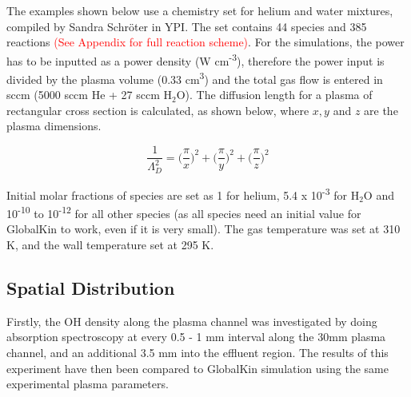 \documentclass[11pt, oneside]{article}   	%
\begin{document}
The examples shown below use a chemistry set for helium and water mixtures, compiled by Sandra Schr\"oter in YPI.
The set contains 44 species and 385 reactions \textcolor{red}{(See Appendix for full reaction scheme)}.
For the simulations, the power has to be inputted as a power density (W cm\textsuperscript{-3}), therefore the power input is divided by the plasma volume (0.33 cm\textsuperscript{3}) and the total gas flow is entered in sccm (5000 sccm He + 27 sccm H$_2$O).
The diffusion length for a plasma of rectangular cross section is calculated, as shown below, where $x, y$ and $z$ are the plasma dimensions.

\begin{equation}
\frac{1}{\Lambda_D^2} = \Big(\frac{\pi}{x}\Big)^2 + \Big(\frac{\pi}{y}\Big)^2 + \Big(\frac{\pi}{z}\Big)^2
\end{equation}

Initial molar fractions of species are set as 1 for helium, 5.4 x 10\textsuperscript{-3} for H$_2$O and 10\textsuperscript{-10} to 10\textsuperscript{-12} for all other species (as all species need an initial value for GlobalKin to work, even if it is very small). 
The gas temperature was set at 310 K, and the wall temperature set at 295 K.


\subsection{Spatial Distribution}

Firstly, the OH density along the plasma channel was investigated by doing absorption spectroscopy at every 0.5 - 1 mm interval along the 30mm plasma channel, and an additional 3.5 mm into the effluent region.
The results of this experiment have then been compared to GlobalKin simulation using the same experimental plasma parameters.
\end{document}
